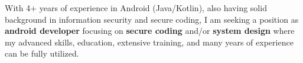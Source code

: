 

\begin{cvparagraph}


With 4+ years of experience in Android (Java/Kotlin), also having solid background in information security and secure coding, I am seeking a position as \textbf{android developer} focusing on \textbf{secure coding} and/or \textbf{system design} where my advanced skills, education, extensive training, and many years of experience can be fully utilized.

\end{cvparagraph}
